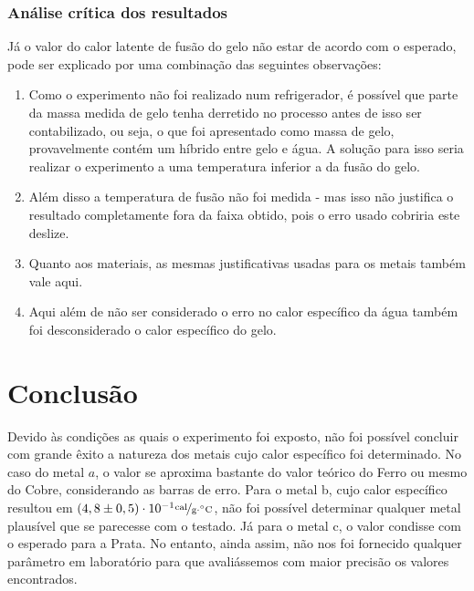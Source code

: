 \documentclass[a4paper]{article}
\begin{document}
			\subsubsection{Análise crítica dos resultados}
				Já o valor do calor latente de fusão do gelo não estar de acordo com o esperado,
				pode ser explicado por uma combinação das seguintes observações:
					\begin{enumerate}
						\item Como o experimento não foi realizado num refrigerador, é possível
						que parte da massa medida de gelo tenha derretido no processo antes
						de isso ser contabilizado, ou seja, o que foi apresentado como massa
						de gelo, provavelmente contém um híbrido entre gelo e água. A solução
						para isso seria realizar o experimento a uma temperatura inferior
						a da fusão do gelo.
						\item Além disso a temperatura de fusão não foi medida - mas isso não justifica
						o resultado completamente fora da faixa obtido, pois o erro usado cobriria este deslize.
						\item Quanto aos materiais, as mesmas justificativas usadas para os metais
						também vale aqui.
						\item Aqui além de não ser considerado o erro no calor específico da água
						também foi desconsiderado o calor específico do gelo.
					\end{enumerate}

	\section{Conclusão}
    
    		Devido às condições as quais o experimento foi exposto, não foi possível
            concluir com grande êxito a natureza dos metais cujo calor específico foi 
            determinado. No caso do metal $a$, o valor se aproxima bastante do valor 
            teórico do Ferro ou mesmo do Cobre, considerando as barras de erro. Para o metal b, 
            cujo calor específico resultou em $\left(4,8\pm0,5\right)
            \cdot10^{-1}\unitfrac{cal}{g\cdot^{\circ}C}$, não foi possível determinar 
            qualquer metal 
            plausível que se parecesse com o testado. Já para o metal c, o valor condisse 
            com o esperado para a Prata. No entanto, ainda assim, não nos foi fornecido 
            qualquer parâmetro em laboratório para que avaliássemos com maior precisão os 
            valores encontrados.
            
\end{document}
